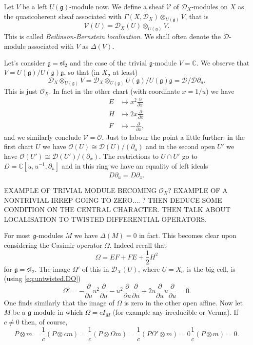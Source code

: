 \documentclass[12pt]{article}
\theoremstyle{plain}
\theoremstyle{definition}
\numberwithin{equation}{section}
\newcommand{\V}{\mathcal{V}}
\newcommand{\Om}{\Omega}
\newcommand{\D}{\Delta}
\newcommand{\C}{\mathbb{C}}
\newcommand{\g}{\mathfrak{g}}
\newcommand{\sll}{\mathfrak{sl}}
\newcommand{\CD}{\mathcal{D}}
\newcommand{\CV}{\mathcal{V}}
\newcommand{\OO}{\mathcal{O}}
\begin{document}
Let $V$ be a left $U(\g)$-module now. We define a sheaf $\CV$ of $\CD_X$-modules on $X$ as the quasicoherent sheaf associated with $\Gamma(X, \CD_X) \otimes_{U(\g)} V$, that is
\[
\V(U) = \CD_X(U) \otimes_{U(\g)} V.
\]
This is called \emph{Beilinson-Bernstein localisation}. We shall often denote the $\CD$-module associated with $V$ as $\D(V)$.

Let's consider $\g = \sll_2$ and the case of the trivial $\g$-module $V = \C$. We observe that $V = U(\g) / U(\g)\g$, so that (in $X_\sigma$ at least)
\[
\CD_X \otimes_{U(\g)} V = \CD_X \otimes_{U(\g)} U(\g) / U(\g) \g = \CD / \CD \partial_u.
\]
This is just $\OO_X$. In fact in the other chart (with coordinate $x = 1/u$) we have
\begin{align*}
E &\mapsto x^2 \frac{\partial}{\partial x} \\
%
H &\mapsto 2 x \frac{\partial}{\partial x} \\
%
F &\mapsto -\frac{\partial}{\partial x},
\end{align*}
and we similarly conclude $\CV = \OO$. Just to labour the point a little further: in the first chart $U$ we have $\OO(U) \cong \CD(U) / (\partial_u)$ and in the second open $U'$ we have $\OO(U') \cong \CD(U') / (\partial_x)$. The restrictions to $U \cap U'$ go to $D = \C[u, u^{-1}, \partial_u]$ and in this ring we have an equality of left ideals
\[
D \partial_u = D \partial_x.
\]




EXAMPLE OF TRIVIAL MODULE BECOMING $\OO_X$? EXAMPLE OF A NONTRIVIAL IRREP GOING TO ZERO.... ? THEN DEDUCE SOME CONDITION ON THE CENTRAL CHARACTER. THEN TALK ABOUT LOCALISATION TO TWISTED DIFFERENTIAL OPERATORS.






For most $\g$-modules $M$ we have $\D(M) = 0$ in fact. This becomes clear upon considering the Casimir operator $\Om$. Indeed recall that
\[
\Om = EF + FE + \frac{1}{2}H^2
\]
for $\g = \sll_2$. The image $\Om'$ of this in $\CD_X(U)$, where $U = X_\sigma$ is the big cell, is (using \eqref{eq:untwisted.DO})
\[
\Om' = -\frac{\partial}{\partial u} u^2 \frac{\partial}{\partial u} - u^2 \frac{\partial}{\partial u} \frac{\partial}{\partial u} + 2 u \frac{\partial}{\partial u} u \frac{\partial}{\partial u} = 0.
\]
One finds similarly that the image of $\Om$ is zero in the other open affine. Now let $M$ be a $\g$-module in which $\Om = c I_M$ (for example any irreducible or Verma). If $c \neq 0$ then, of course,
\[
P \otimes m = \frac{1}{c} (P \otimes c m) = \frac{1}{c} (P \otimes \Om m) = \frac{1}{c} (P \Om' \otimes m) = 0 \frac{1}{c} (P \otimes m) = 0.
\]
\end{document}

